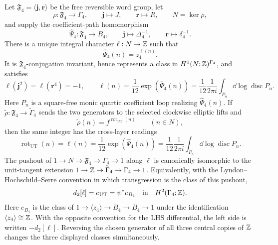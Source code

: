 \begin{corollary}
\label{cor:q4-central-history-transgression}
Let $\mathfrak F_4=\langle\mathbf j,\mathbf r\rangle$ be the free reversible
word group, let
\begin{equation}
 \rho:\mathfrak F_4\longrightarrow\Gamma_4,
 \qquad
 \mathbf j\longmapsto J,
 \qquad
 \mathbf r\longmapsto R,
 \qquad
 N=\ker\rho,
 \label{eq:q4-free-word-operator-extension}
\end{equation}
and supply the coefficient-path homomorphism
\begin{equation}
 \widehat\Psi_4:\mathfrak F_4\longrightarrow B_4,
 \qquad
 \mathbf j\longmapsto\Delta_4^{-1},
 \qquad
 \mathbf r\longmapsto\delta_4^{-1}.
 \label{eq:q4-supplied-four-root-path-map}
\end{equation}
There is a unique integral character $\ell:N\to\mathbb{Z}$ such that
\begin{equation}
 \widehat\Psi_4(n)=z_4^{\ell(n)}.
 \label{eq:q4-central-history-character}
\end{equation}
It is $\mathfrak F_4$-conjugation invariant, hence represents a class in
$H^1(N;\mathbb{Z})^{\Gamma_4}$, and satisfies
\begin{equation}
 \ell(\mathbf j^2)=\ell(\mathbf r^4)=-1,
 \qquad
 \ell(n)=\frac1{12}\operatorname{exp}(\widehat\Psi_4(n))
 =\frac1{12}\frac1{2\pi i}\int_{P_n}\dd\log\operatorname{disc}P_n.
 \label{eq:q4-central-history-period}
\end{equation}
Here $P_n$ is a square-free monic quartic coefficient loop realizing
$\widehat\Psi_4(n)$.  If
$\widetilde\rho:\mathfrak F_4\to\widetilde\Gamma_4$ sends the two generators
to the selected clockwise elliptic lifts and
\begin{equation}
 \widetilde\rho(n)=f^{\operatorname{rot}_{\mathrm{UT}}(n)}
 \qquad(n\in N),
 \label{eq:q4-unit-tangent-relation-rotation}
\end{equation}
then the same integer has the cross-layer readings
\begin{equation}
 \operatorname{rot}_{\mathrm{UT}}(n)
 =\ell(n)
 =\frac1{12}\operatorname{exp}(\widehat\Psi_4(n))
 =\frac1{12}\frac1{2\pi i}\int_{P_n}\dd\log\operatorname{disc}P_n.
 \label{eq:q4-central-residue-cross-layer-identity}
\end{equation}
The pushout of
$1\to N\to\mathfrak F_4\to\Gamma_4\to1$ along $\ell$ is canonically
isomorphic to the unit-tangent extension
$1\to\mathbb{Z}\to\widetilde\Gamma_4\to\Gamma_4\to1$.  Equivalently, with the
Lyndon--Hochschild--Serre convention in which transgression is the class of this
pushout,
\begin{equation}
 d_2[\ell]=e_{\mathrm{UT}}=\psi^*e_{B_4}
 \quad\text{in}\quad H^2(\Gamma_4;\mathbb{Z}).
 \label{eq:q4-central-history-transgression}
\end{equation}
Here $e_{B_4}$ is the class of
$1\to\langle z_4\rangle\to B_4\to\overline B_4\to1$ under the
identification $\langle z_4\rangle\cong\mathbb{Z}$.
With the opposite convention for the LHS differential, the left side is written
$-d_2[\ell]$.  Reversing the chosen generator of all three central copies of
$\mathbb{Z}$ changes the three displayed classes simultaneously.
\end{corollary}

